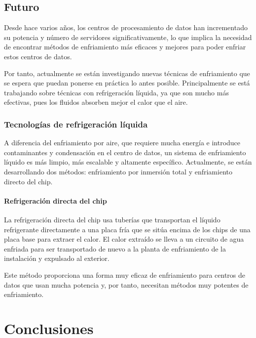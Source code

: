 \section{Futuro}

Desde hace varios años, los centros de procesamiento de datos han incrementado su potencia y número de servidores significativamente, lo que implica la necesidad de encontrar métodos de enfriamiento más eficaces y mejores para poder enfriar estos centros de datos.

Por tanto, actualmente se están investigando nuevas técnicas de enfriamiento que se espera que puedan ponerse en práctica lo antes posible. Principalmente se está trabajando sobre técnicas con refrigeración líquida, ya que son mucho más efectivas, pues los fluidos absorben mejor el calor que el aire.

\subsection{Tecnologías de refrigeración líquida}

A diferencia del enfriamiento por aire, que requiere mucha energía e introduce contaminantes y condensación en el centro de datos, un sistema de enfriamiento líquido es más limpio, más escalable y altamente específico. Actualmente, se están desarrollando dos métodos: enfriamiento por inmersión total y enfriamiento directo del chip.

\subsubsection{Refrigeración directa del chip}

La refrigeración directa del chip usa tuberías que transportan el líquido refrigerante directamente a una placa fría que se sitúa encima de los chips de una placa base para extraer el calor. El calor extraído se lleva a un circuito de agua enfriada para ser transportado de nuevo a la planta de enfriamiento de la instalación  y expulsado al exterior.

Este método proporciona una forma muy eficaz de enfriamiento para centros de datos que usan mucha potencia y, por tanto, necesitan métodos muy potentes de enfriamiento.

\chapter{Conclusiones}

